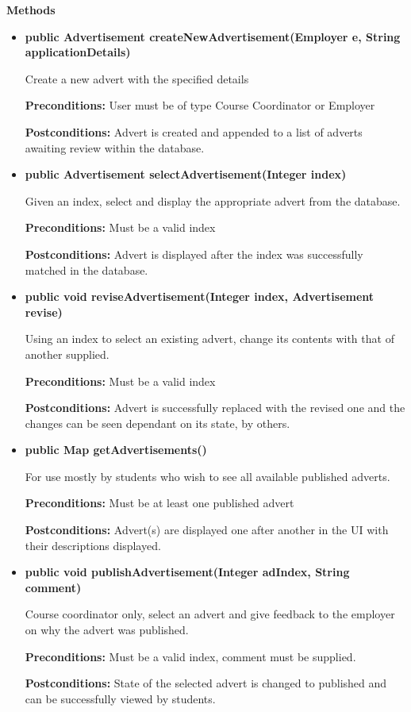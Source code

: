 \documentclass[11pt]{l3deliverable}
\begin{document}
\textbf{Methods}

\begin{itemize}

\item{\textbf{public Advertisement createNewAdvertisement(Employer e,
      String applicationDetails)}

Create a new advert with the specified details

\textbf{Preconditions:} User must be of type Course Coordinator or Employer

\textbf{Postconditions:} Advert is created and appended to a list of adverts awaiting 
review within the database.}

\item{\textbf{public Advertisement selectAdvertisement(Integer index)}

Given an index, select and display the appropriate advert from the database.

\textbf{Preconditions:} Must be a valid index

\textbf{Postconditions:} Advert is displayed after the index was successfully matched
in the database.}

\item{\textbf{public void reviseAdvertisement(Integer index, Advertisement revise)}

Using an index to select an existing advert, change its contents with that of another supplied.

\textbf{Preconditions:} Must be a valid index

\textbf{Postconditions:} Advert is successfully replaced with the revised one and the changes
can be seen dependant on its state, by others.}

\item{\textbf{public Map getAdvertisements()}

For use mostly by students who wish to see all available published adverts.

\textbf{Preconditions:} Must be at least one published advert

\textbf{Postconditions:} Advert(s) are displayed one after another in the UI with their
descriptions displayed.}

\item{\textbf{public void publishAdvertisement(Integer adIndex, String comment)}

Course coordinator only, select an advert and give feedback to the employer on why the advert was published.

\textbf{Preconditions:} Must be a valid index, comment must be supplied.

\textbf{Postconditions:} State of the selected advert is changed to published and can be
successfully viewed by students.}

\end{itemize}
\newpage
\end{document}
